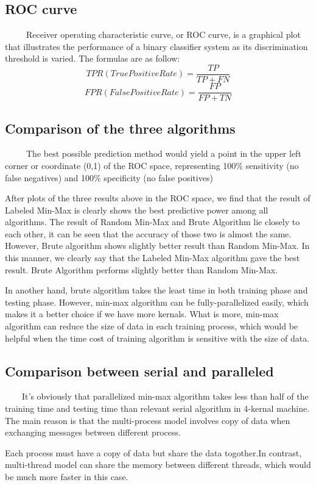 \documentclass[11pt]{article}
\begin{document}
\subsection{ROC curve}
\label{sec-6-2}
\ \ \ \ \ Receiver operating characteristic curve, or ROC curve, is a graphical plot that illustrates the performance of a binary classifier system as its discrimination threshold is varied.
The formulas are as follow:
\begin{equation}
TPR(True Positive Rate) = \frac{TP}{TP+FN}
\end{equation}
\begin{equation}
FPR(False Positive Rate) = \frac{FP}{FP+TN}
\end{equation}

\subsection{Comparison of the three algorithms}
\label{sec-6-3}
\ \ \ \ \ The best possible prediction method would yield a point in the upper left corner or coordinate (0,1) of the ROC space, representing 100\% sensitivity (no false negatives) and 100\% specificity (no false positives)

After plots of the three results above in the ROC space, we find that the result of Labeled Min-Max is clearly shows the best predictive power among all algorithms. The result of Random Min-Max and Brute Algorithm lie closely to each other, it can be seen that the accuracy of those two is almost the same. However, Brute algorithm shows slightly better result than Random Min-Max.
In this manner, we clearly say that the Labeled Min-Max algorithm gave the best result. Brute Algorithm performs slightly better than Random Min-Max.

In another hand, brute algorithm takes the least time in both training phase and testing phase. However, min-max algorithm can be fully-parallelized
easily, which makes it a better choice if we have more kernals. What is more, min-max algorithm can reduce the size of data in each training process,
which would be helpful when the time cost of training algorithm is sensitive with the size of data.

\subsection{Comparison between serial and paralleled}
\label{sec-6-4}
\ \ \ \ It's obviously that parallelized min-max algorithm takes less than half of the training time and testing time than relevant serial algorithm in 4-kernal machine. The main reason is that the multi-process model involves copy of data when exchanging messages between different process.

Each process must have a copy of data but share the data togother.In contrast, multi-thread model can share the memory between different threads,
which would be much more faster in this case.


\label{sec-5}
\end{document}
